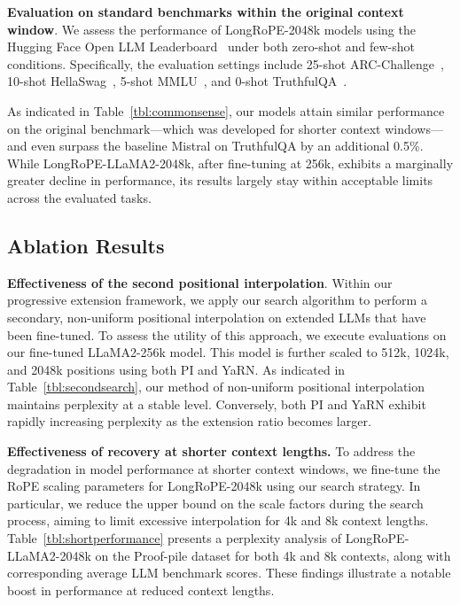 \textbf{Evaluation on standard benchmarks within the original context window}. We assess the performance of LongRoPE-2048k models using the Hugging Face Open LLM Leaderboard~\cite{huggingfaceboard} under both zero-shot and few-shot conditions. Specifically, the evaluation settings include 25-shot ARC-Challenge~\cite{allenai:arc}, 10-shot HellaSwag~\cite{zellers2019hellaswag}, 5-shot MMLU~\cite{mmlu}, and 0-shot TruthfulQA~\cite{lin2021truthfulqa}.

As indicated in Table~\ref{tbl:commonsense}, our models attain similar performance on the original benchmark—which was developed for shorter context windows—and even surpass the baseline Mistral on TruthfulQA by an additional 0.5\%. While LongRoPE-LLaMA2-2048k, after fine-tuning at 256k, exhibits a marginally greater decline in performance, its results largely stay within acceptable limits across the evaluated tasks.

\subsection{Ablation Results}

\textbf{Effectiveness of the second positional interpolation}. Within our progressive extension framework, we apply our search algorithm to perform a secondary, non-uniform positional interpolation on extended LLMs that have been fine-tuned. To assess the utility of this approach, we execute evaluations on our fine-tuned LLaMA2-256k model. This model is further scaled to 512k, 1024k, and 2048k positions using both PI and YaRN. As indicated in Table~\ref{tbl:secondsearch}, our method of non-uniform positional interpolation maintains perplexity at a stable level. Conversely, both PI and YaRN exhibit rapidly increasing perplexity as the extension ratio becomes larger.

\textbf{Effectiveness of recovery at shorter context lengths.} To address the degradation in model performance at shorter context windows, we fine-tune the RoPE scaling parameters for LongRoPE-2048k using our search strategy. In particular, we reduce the upper bound on the scale factors during the search process, aiming to limit excessive interpolation for 4k and 8k context lengths. Table~\ref{tbl:shortperformance} presents a perplexity analysis of LongRoPE-LLaMA2-2048k on the Proof-pile dataset for both 4k and 8k contexts, along with corresponding average LLM benchmark scores. These findings illustrate a notable boost in performance at reduced context lengths.

